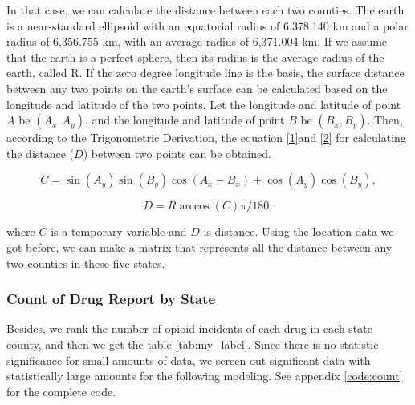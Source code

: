 \documentclass{mcmthesis}
\begin{document}
In that case, we can calculate the distance between each two counties. The earth is a near-standard ellipsoid with an equatorial radius of 6,378.140 km and a polar radius of 6,356.755 km, with an average radius of 6,371.004 km. If we assume that the earth is a perfect sphere, then its radius is the average radius of the earth, called R. If the zero degree longitude line is the basis, the surface distance between any two points on the earth's surface can be calculated based on the longitude and latitude of the two points. Let the longitude and latitude of point $A$ be $(A_x, A_y)$, and the longitude and latitude of point $B$ be $(B_x, B_y)$. Then, according to the Trigonometric Derivation, the equation \ref{1}and \ref{2} for calculating the distance ($D$) between two points can be obtained.

\begin{equation}
\label{1}
          C = \sin(A_y)\sin(B_y)\cos(A_x-B_x) + \cos(A_y)\cos(B_y),
\end{equation}

\begin{equation}
\label{2}
         D = R\arccos(C)\pi/180,
\end{equation}

    
    where $C$ is a temporary variable and $D$ is distance. Using the location data we got before, we can make a matrix that represents all the distance between any two counties in these five states.

\subsubsection{Count of Drug Report by State}\label{count-drug}

    Besides, we rank the number of opioid incidents of each drug in each state county, and then we get the table \ref{tab:my_label}. Since there is no statistic significance for small amounts of data, we screen out significant data with statistically large amounts for the following modeling. See appendix \ref{code:count} for the complete code. 
    
\end{document}
